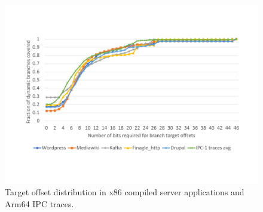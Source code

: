 

\begin{figure}
\centering
\includegraphics[width=\columnwidth, trim=70 90 60 100, clip]{figures/x86-IPC.pdf}
\caption{Target offset distribution in x86 compiled server applications and Arm64 IPC traces.}
\label{hpca:fig:x86_res}
\end{figure}
